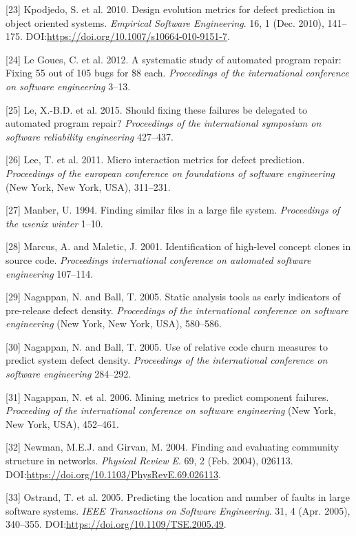 \documentclass[sigconf]{acmart}
\begin{document}
[23] Kpodjedo, S. et al. 2010. Design evolution metrics for defect
prediction in object oriented systems. \emph{Empirical Software
Engineering}. 16, 1 (Dec. 2010), 141--175.
DOI:\url{https://doi.org/10.1007/s10664-010-9151-7}.

[24] Le Goues, C. et al. 2012. A systematic study of automated
program repair: Fixing 55 out of 105 bugs for \$8 each.
\emph{Proceedings of the international conference on software
engineering} 3--13.

[25] Le, X.-B.D. et al. 2015. Should fixing these failures be
delegated to automated program repair? \emph{Proceedings of the
international symposium on software reliability engineering} 427--437.

[26] Lee, T. et al. 2011. Micro interaction metrics for defect
prediction. \emph{Proceedings of the european conference on foundations
of software engineering} (New York, New York, USA), 311--231.

[27] Manber, U. 1994. Finding similar files in a large file system.
\emph{Proceedings of the usenix winter} 1--10.

[28] Marcus, A. and Maletic, J. 2001. Identification of high-level
concept clones in source code. \emph{Proceedings international
conference on automated software engineering} 107--114.

[29] Nagappan, N. and Ball, T. 2005. Static analysis tools as early
indicators of pre-release defect density. \emph{Proceedings of the
international conference on software engineering} (New York, New York,
USA), 580--586.

[30] Nagappan, N. and Ball, T. 2005. Use of relative code churn
measures to predict system defect density. \emph{Proceedings of the
international conference on software engineering} 284--292.

[31] Nagappan, N. et al. 2006. Mining metrics to predict component
failures. \emph{Proceeding of the international conference on software
engineering} (New York, New York, USA), 452--461.

[32] Newman, M.E.J. and Girvan, M. 2004. Finding and evaluating
community structure in networks. \emph{Physical Review E}. 69, 2 (Feb.
2004), 026113. DOI:\url{https://doi.org/10.1103/PhysRevE.69.026113}.

[33] Ostrand, T. et al. 2005. Predicting the location and number of
faults in large software systems. \emph{IEEE Transactions on Software
Engineering}. 31, 4 (Apr. 2005), 340--355.
DOI:\url{https://doi.org/10.1109/TSE.2005.49}.
\end{document}
